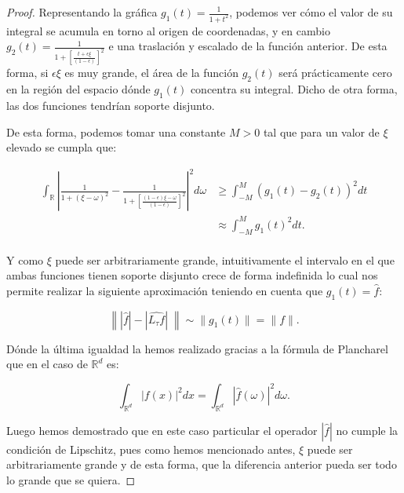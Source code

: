 \begin{proof}
\noindent Representando la gráfica $g_1(t)= \frac{1}{1+t^2}$, podemos ver cómo el valor de su integral se acumula en torno al origen de coordenadas, y en cambio $g_2(t)=\frac{1}{1+\left[ \frac{t+\epsilon\xi}{(1-\epsilon)}\right]^2}$ e una traslación y escalado de la función anterior. De esta forma, si $\epsilon\xi$ es muy grande, el área de la función $g_2(t)$ será prácticamente cero en la región del espacio dónde $g_1(t)$ concentra su integral. Dicho de otra forma, las dos funciones tendrían soporte disjunto.

\noindent De esta forma, podemos tomar una constante $M>0$ tal que para un valor de $\xi$ elevado se cumpla que: 

\begin{align*}
  \int_{\mathbb{R}} \left| \frac{1}{1+(\xi - \omega)^2} - \frac{1}{1+\left[ \frac{(1-\epsilon) \xi - \omega}{(1-\epsilon)}\right]^2} \right|^2 d\omega 
  &\geq \int_{-M}^{M} (g_1(t)-g_2(t))^2 dt \\
  &\approx \int_{-M}^{M} g_1(t)^2 dt. \\
\end{align*}

\noindent Y como $\xi$ puede ser arbitrariamente grande, intuitivamente el intervalo en el que ambas funciones tienen soporte disjunto crece de forma indefinida lo cual nos permite realizar la siguiente aproximación teniendo en cuenta que $g_1(t)=\widehat{f}$:

\begin{equation} \label{eq::1.1}
  \left\| |\widehat{f}| -|\widehat{L_\tau f}| \; \right\| \sim \|g_1(t) \|=\|f\|. 
\end{equation}

\noindent Dónde la última igualdad la hemos realizado gracias a la fórmula de Plancharel que en el caso de $\mathbb{R}^d$ es: 

\begin{equation} \label{eq::Plancharel}
  \int_{\mathbb{R}^d} \left|f(x)\right|^2 dx= \int_{\mathbb{R}^d}\left|\widehat{f}(\omega)\right|^2 d\omega.
\end{equation}

\noindent Luego hemos demostrado que en este caso particular el operador $|\widehat{f}|$ no cumple la condición de Lipschitz, pues como hemos mencionado antes, $\xi$ puede ser arbitrariamente grande y de esta forma, que la diferencia anterior pueda ser todo lo grande que se quiera.


\end{proof}
